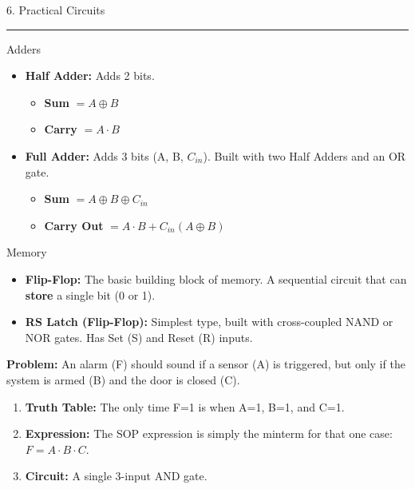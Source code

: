 \documentclass[a4paper, 8pt]{extarticle}
\newcommand{\sectionheading}[1]{%
  \par\vspace{0.7em}
  {\headingfont\fontsize{10.5pt}{11.5pt}\selectfont\color{black}#1}\par\nopagebreak
  \rule{\linewidth}{0.4pt}\vspace{0.2em}\nopagebreak
}
\newcommand{\subsectionheading}[1]{%
  \par\vspace{0.4em}\nopagebreak
  {\headingfont\fontsize{9pt}{10pt}\selectfont\color{black!80}#1}\par\nopagebreak\vspace{-0.3em}
}
\begin{document}
\begin{multicols}{3}
\sectionheading{6. Practical Circuits}
\subsectionheading{Adders}
\begin{itemize}
    \item \textbf{Half Adder:} Adds 2 bits.
        \begin{itemize}
            \item \textbf{Sum} $= A \oplus B$
            \item \textbf{Carry} $= A \cdot B$
        \end{itemize}
    \item \textbf{Full Adder:} Adds 3 bits (A, B, $C_{in}$). Built with two Half Adders and an OR gate.
        \begin{itemize}
            \item \textbf{Sum} $= A \oplus B \oplus C_{in}$
            \item \textbf{Carry Out} $= A \cdot B + C_{in}(A \oplus B)$
        \end{itemize}
\end{itemize}

\subsectionheading{Memory}
\begin{itemize}
    \item \textbf{Flip-Flop:} The basic building block of memory. A sequential circuit that can \textbf{store} a single bit (0 or 1).
    \item \textbf{RS Latch (Flip-Flop):} Simplest type, built with cross-coupled NAND or NOR gates. Has Set (S) and Reset (R) inputs.
\end{itemize}

\begin{tcolorbox}[title=Design Example: Simple Alarm]
\textbf{Problem:} An alarm (F) should sound if a sensor (A) is triggered, but only if the system is armed (B) and the door is closed (C).
\begin{enumerate}
    \item \textbf{Truth Table:} The only time F=1 is when A=1, B=1, and C=1.
    \item \textbf{Expression:} The SOP expression is simply the minterm for that one case: $F = A \cdot B \cdot C$.
    \item \textbf{Circuit:} A single 3-input AND gate.
\end{enumerate}
\end{tcolorbox}

\end{multicols}
\end{document}
